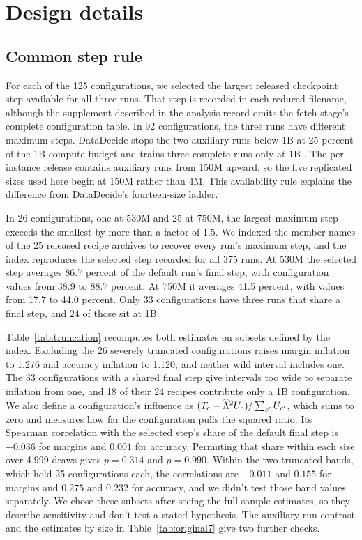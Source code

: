 \section{Design details}
\label{app:design}

\subsection{Common step rule}
\label{app:schedule}
For each of the 125 configurations, we selected the largest released checkpoint step available for all three runs. That step is recorded in each reduced filename, although the supplement described in the analysis record omits the fetch stage's complete configuration table. In 92 configurations, the three runs have different maximum steps. DataDecide stops the two auxiliary runs below 1B at 25 percent of the 1B compute budget and trains three complete runs only at 1B \citep{magnusson2025}. The per-instance release contains auxiliary runs from 150M upward, so the five replicated sizes used here begin at 150M rather than 4M. This availability rule explains the difference from DataDecide's fourteen-size ladder.

In 26 configurations, one at 530M and 25 at 750M, the largest maximum step exceeds the smallest by more than a factor of 1.5. We indexed the member names of the 25 released recipe archives to recover every run's maximum step, and the index reproduces the selected step recorded for all 375 runs. At 530M the selected step averages 86.7 percent of the default run's final step, with configuration values from 38.9 to 88.7 percent. At 750M it averages 41.5 percent, with values from 17.7 to 44.0 percent. Only 33 configurations have three runs that share a final step, and 24 of those sit at 1B.

Table~\ref{tab:truncation} recomputes both estimates on subsets defined by the index. Excluding the 26 severely truncated configurations raises margin inflation to 1.276 and accuracy inflation to 1.120, and neither wild interval includes one. The 33 configurations with a shared final step give intervals too wide to separate inflation from one, and 18 of their 24 recipes contribute only a 1B configuration. We also define a configuration's influence as $(T_c-\widehat{\Lambda}^2U_c)/\sum_{c'}U_{c'}$, which sums to zero and measures how far the configuration pulls the squared ratio. Its Spearman correlation with the selected step's share of the default final step is $-0.036$ for margins and $0.001$ for accuracy. Permuting that share within each size over 4,999 draws gives $p=0.314$ and $p=0.990$. Within the two truncated bands, which hold 25 configurations each, the correlations are $-0.011$ and $0.155$ for margins and $0.275$ and $0.232$ for accuracy, and we didn't test those band values separately. We chose these subsets after seeing the full-sample estimates, so they describe sensitivity and don't test a stated hypothesis. The auxiliary-run contrast and the estimates by size in Table~\ref{tab:original7} give two further checks.


